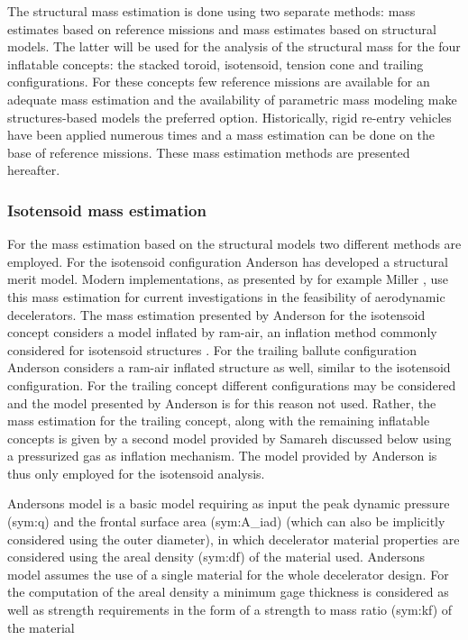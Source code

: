The structural mass estimation is done using two separate methods: mass estimates based on reference missions and mass estimates based on structural models. The latter will be used for the analysis of the structural mass for the four inflatable concepts: the stacked toroid, isotensoid, tension cone and trailing configurations. For these concepts few reference missions are available for an adequate mass estimation and the availability of parametric mass modeling \cite{Anderson1969, Samareh2011} make structures-based models the preferred option. Historically, rigid re-entry vehicles have been applied numerous times and a mass estimation can be done on the base of reference missions. These mass estimation methods are presented hereafter.

\subsubsection{Isotensoid mass estimation}
For the mass estimation based on the structural models two different methods are employed. For the isotensoid configuration Anderson \cite{Anderson1969} has developed a structural merit model. Modern implementations, as presented by for example Miller \cite{Miller2014}, use this mass estimation for current investigations in the feasibility of aerodynamic decelerators. The mass estimation presented by Anderson for the isotensoid concept considers a model inflated by ram-air, an inflation method commonly considered for isotensoid structures \cite{Smith2011}. For the trailing ballute configuration Anderson considers a ram-air inflated structure as well, similar to the isotensoid configuration. For the trailing concept different configurations may be considered and the model presented by Anderson is for this reason not used. Rather, the mass estimation for the trailing concept, along with the remaining inflatable concepts is given by a second model provided by Samareh \cite{Samareh2011} discussed below using a pressurized gas as inflation mechanism. The model provided by Anderson is thus only employed for the isotensoid analysis. 

Andersons model \cite{Anderson1969} is a basic model requiring as input the peak dynamic pressure (\gls{sym:q}) and the frontal surface area (\gls{sym:A_iad}) (which can also be implicitly considered using the outer diameter), in which decelerator material properties are considered using the areal density (\gls{sym:df}) of the material used. Andersons model assumes the use of a single material for the whole decelerator design. For the computation of the areal density a minimum gage thickness is considered as well as strength requirements in the form of a strength to mass ratio (\gls{sym:kf}) of the material

